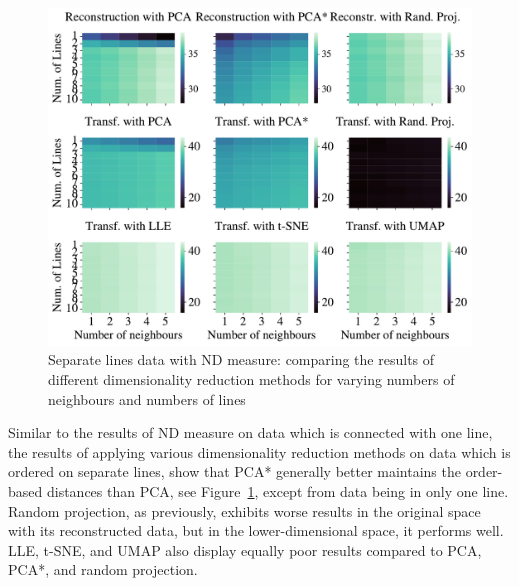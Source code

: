\documentclass[pdftex,12pt,a4paper]{report}
\begin{document}
\begin{figure}[htb!]
    \includegraphics[width=\textwidth]{./images/multiple_runs/sep_lines/num_lines_vs_num_neigh/euclidean/all_methods_10runs_10lines_100points_5neighbours.pdf}
    \caption{Separate lines data with ND measure: comparing the results of different dimensionality reduction methods for varying numbers of neighbours and numbers of lines} \label{fig:num_neigh_vs_num_lines_seplines}
\end{figure}

Similar to the results of ND measure on data which is connected with one line, the results of applying various dimensionality reduction methods on data which is ordered on separate lines, show that PCA* generally better maintains the order-based distances than PCA, see Figure~\ref{fig:num_neigh_vs_num_lines_seplines}, except from data being in only one line.
Random projection, as previously, exhibits worse results in the original space with its reconstructed data, but in the lower-dimensional space, it performs well.
LLE, t-SNE, and UMAP also display equally poor results compared to PCA, PCA*, and random projection.
\end{document}
